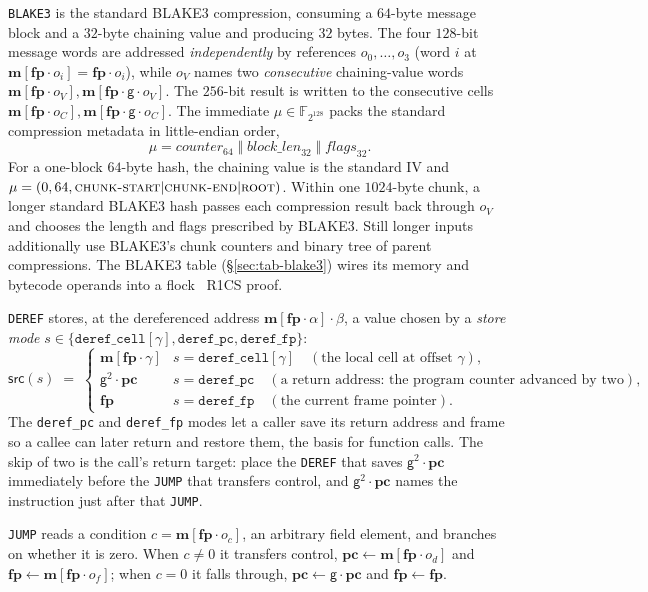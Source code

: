 \documentclass[11pt]{article}
\newcommand{\F}{\mathbb{F}}
\newcommand{\gen}{\mathsf{g}}
\newcommand{\loc}[1]{\mem[\fp\cdot #1]}
\newcommand{\pc}{\mathbf{pc}}
\newcommand{\fp}{\mathbf{fp}}
\newcommand{\mem}{\mathbf{m}}
\newcommand{\srcsel}[1]{\mathsf{src}(#1)}
\begin{document}
\texttt{BLAKE3} is the standard BLAKE3 compression, consuming a $64$-byte message block and a $32$-byte chaining value and producing $32$ bytes. The four $128$-bit message words are addressed \emph{independently} by references $o_0,\dots,o_3$ (word $i$ at $\loc{o_i}=\fp\cdot o_i$), while $o_V$ names two \emph{consecutive} chaining-value words $\loc{o_V},\loc{\gen\cdot o_V}$. The $256$-bit result is written to the consecutive cells $\loc{o_C},\loc{\gen\cdot o_C}$. The immediate $\mu\in\F_{2^{128}}$ packs the standard compression metadata in little-endian order,
\[
  \mu=\mathit{counter}_{64}\;\Vert\;\mathit{block\_len}_{32}\;\Vert\;\mathit{flags}_{32}.
\]
For a one-block $64$-byte hash, the chaining value is the standard IV and $\mu=(0,64,\textsc{chunk-start}|\textsc{chunk-end}|\textsc{root})$. Within one $1024$-byte chunk, a longer standard BLAKE3 hash passes each compression result back through $o_V$ and chooses the length and flags prescribed by BLAKE3. Still longer inputs additionally use BLAKE3's chunk counters and binary tree of parent compressions. The BLAKE3 table (\S\ref{sec:tab-blake3}) wires its memory and bytecode operands into a flock~\cite{flock} R1CS proof.

\texttt{DEREF} stores, at the dereferenced address $\loc{\alpha}\cdot\beta$, a value chosen by a \emph{store mode} $s\in\{\texttt{deref\_cell}[\gamma],\texttt{deref\_pc},\texttt{deref\_fp}\}$:
\[
  \srcsel{s}\;=\;
  \begin{cases}
    \loc{\gamma} & s=\texttt{deref\_cell}[\gamma] \quad(\text{the local cell at offset }\gamma),\\
    \gen^{2}\cdot\pc & s=\texttt{deref\_pc} \quad(\text{a return address: the program counter advanced by two}),\\
    \fp & s=\texttt{deref\_fp} \quad(\text{the current frame pointer}).
  \end{cases}
\]
The \texttt{deref\_pc} and \texttt{deref\_fp} modes let a caller save its return address and frame so a callee can later return and restore them, the basis for function calls. The skip of two is the call's return target: place the \texttt{DEREF} that saves $\gen^{2}\cdot\pc$ immediately before the \texttt{JUMP} that transfers control, and $\gen^{2}\cdot\pc$ names the instruction just after that \texttt{JUMP}.

\texttt{JUMP} reads a condition $c=\loc{o_c}$, an arbitrary field element, and branches on whether it is zero. When $c\neq0$ it transfers control, $\pc\gets\loc{o_d}$ and $\fp\gets\loc{o_f}$; when $c=0$ it falls through, $\pc\gets\gen\cdot\pc$ and $\fp\gets\fp$.
\end{document}
